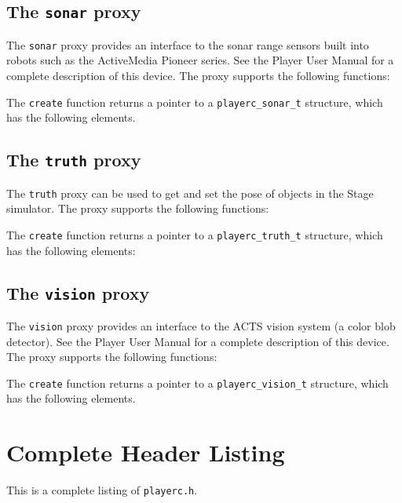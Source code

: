 \documentclass[11pt]{report}
\begin{document}
\newpage
\section{The {\tt sonar} proxy}

The {\tt sonar} proxy provides an interface to the sonar range sensors
built into robots such as the ActiveMedia Pioneer series.  See the
Player User Manual for a complete description of this device.  The
proxy supports the following functions:
\begin{quote}

\end{quote}
The {\tt create} function returns a pointer to a {\tt playerc\_sonar\_t}
structure, which has the following elements.
\begin{quote}

\end{quote}


\newpage
\section{The {\tt truth} proxy}

The {\tt truth} proxy can be used to get and set the pose of objects
in the Stage simulator.  The proxy supports the following functions:
\begin{quote}

\end{quote}
The {\tt create} function returns a pointer to a {\tt playerc\_truth\_t}
structure, which has the following elements:
\begin{quote}

\end{quote}


\newpage
\section{The {\tt vision} proxy}

The {\tt vision} proxy provides an interface to the ACTS vision system
(a color blob detector).  See the Player User Manual for a complete
description of this device.  The proxy supports the following
functions:
\begin{quote}

\end{quote}
The {\tt create} function returns a pointer to a {\tt playerc\_vision\_t}
structure, which has the following elements.
\begin{quote}

\end{quote}


\appendix

\chapter{Complete Header Listing}

This is a complete listing of {\tt playerc.h}.


\end{document}
